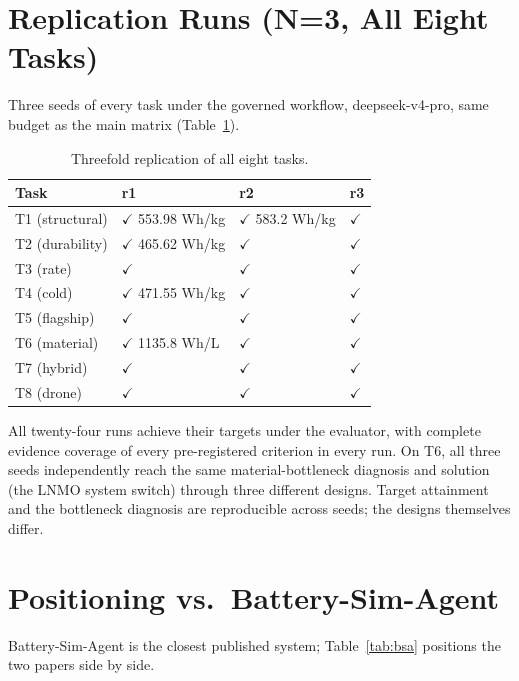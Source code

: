 \documentclass[review,11pt]{elsarticle}
\begin{document}
\section{Replication Runs (N=3, All Eight Tasks)}

Three seeds of every task under the governed workflow, deepseek-v4-pro,
same budget as the main matrix (Table~\ref{tab:replication}).

\begin{table}[!ht]
\centering
\caption{Threefold replication of all eight tasks.}
\label{tab:replication}
\begin{tabular}{p{1.9cm}p{3.5cm}p{3.5cm}p{1.9cm}}
\toprule
Task & r1 & r2 & r3 \\
\midrule
T1 (structural) & $\checkmark$ 553.98 Wh/kg & $\checkmark$ 583.2 Wh/kg & $\checkmark$ \\
T2 (durability) & $\checkmark$ 465.62 Wh/kg & $\checkmark$ & $\checkmark$ \\
T3 (rate) & $\checkmark$ & $\checkmark$ & $\checkmark$ \\
T4 (cold) & $\checkmark$ 471.55 Wh/kg & $\checkmark$ & $\checkmark$ \\
T5 (flagship) & $\checkmark$ & $\checkmark$ & $\checkmark$ \\
T6 (material) & $\checkmark$ 1135.8 Wh/L & $\checkmark$ & $\checkmark$ \\
T7 (hybrid) & $\checkmark$ & $\checkmark$ & $\checkmark$ \\
T8 (drone) & $\checkmark$ & $\checkmark$ & $\checkmark$ \\
\bottomrule
\end{tabular}
\end{table}

All twenty-four runs achieve their targets under the evaluator,
with complete evidence coverage of every pre-registered
criterion in every run. On T6, all three seeds independently reach the same
material-bottleneck diagnosis and solution (the LNMO system switch) through
three different designs. Target attainment and the bottleneck diagnosis
are reproducible across seeds; the designs themselves differ.

\section{Positioning vs.\ Battery-Sim-Agent}

Battery-Sim-Agent \cite{chen2026battery} is the closest published system;
Table~\ref{tab:bsa} positions the two papers side by side.
\end{document}

